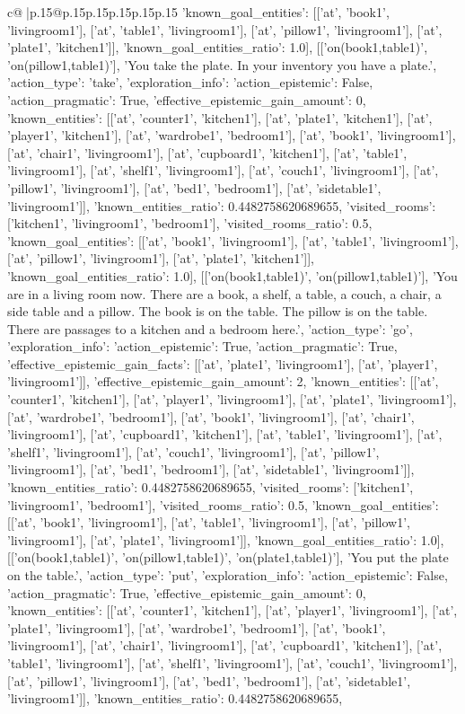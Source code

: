 \documentclass{article}
\begin{document}
{\begin{supertabular}{c@{$\;$}|p{.15\linewidth}@{}p{.15\linewidth}p{.15\linewidth}p{.15\linewidth}p{.15\linewidth}p{.15\linewidth}}
{{{'known_goal_entities': [['at', 'book1', 'livingroom1'], ['at', 'table1', 'livingroom1'], ['at', 'pillow1', 'livingroom1'], ['at', 'plate1', 'kitchen1']], 'known_goal_entities_ratio': 1.0}}], [['on(book1,table1)', 'on(pillow1,table1)'], 'You take the plate. In your inventory you have a plate.\n', {'action_type': 'take', 'exploration_info': {'action_epistemic': False, 'action_pragmatic': True, 'effective_epistemic_gain_amount': 0, 'known_entities': [['at', 'counter1', 'kitchen1'], ['at', 'plate1', 'kitchen1'], ['at', 'player1', 'kitchen1'], ['at', 'wardrobe1', 'bedroom1'], ['at', 'book1', 'livingroom1'], ['at', 'chair1', 'livingroom1'], ['at', 'cupboard1', 'kitchen1'], ['at', 'table1', 'livingroom1'], ['at', 'shelf1', 'livingroom1'], ['at', 'couch1', 'livingroom1'], ['at', 'pillow1', 'livingroom1'], ['at', 'bed1', 'bedroom1'], ['at', 'sidetable1', 'livingroom1']], 'known_entities_ratio': 0.4482758620689655, 'visited_rooms': ['kitchen1', 'livingroom1', 'bedroom1'], 'visited_rooms_ratio': 0.5, 'known_goal_entities': [['at', 'book1', 'livingroom1'], ['at', 'table1', 'livingroom1'], ['at', 'pillow1', 'livingroom1'], ['at', 'plate1', 'kitchen1']], 'known_goal_entities_ratio': 1.0}}], [['on(book1,table1)', 'on(pillow1,table1)'], 'You are in a living room now. There are a book, a shelf, a table, a couch, a chair, a side table and a pillow. The book is on the table. The pillow is on the table. There are passages to a kitchen and a bedroom here.\n', {'action_type': 'go', 'exploration_info': {'action_epistemic': True, 'action_pragmatic': True, 'effective_epistemic_gain_facts': [['at', 'plate1', 'livingroom1'], ['at', 'player1', 'livingroom1']], 'effective_epistemic_gain_amount': 2, 'known_entities': [['at', 'counter1', 'kitchen1'], ['at', 'player1', 'livingroom1'], ['at', 'plate1', 'livingroom1'], ['at', 'wardrobe1', 'bedroom1'], ['at', 'book1', 'livingroom1'], ['at', 'chair1', 'livingroom1'], ['at', 'cupboard1', 'kitchen1'], ['at', 'table1', 'livingroom1'], ['at', 'shelf1', 'livingroom1'], ['at', 'couch1', 'livingroom1'], ['at', 'pillow1', 'livingroom1'], ['at', 'bed1', 'bedroom1'], ['at', 'sidetable1', 'livingroom1']], 'known_entities_ratio': 0.4482758620689655, 'visited_rooms': ['kitchen1', 'livingroom1', 'bedroom1'], 'visited_rooms_ratio': 0.5, 'known_goal_entities': [['at', 'book1', 'livingroom1'], ['at', 'table1', 'livingroom1'], ['at', 'pillow1', 'livingroom1'], ['at', 'plate1', 'livingroom1']], 'known_goal_entities_ratio': 1.0}}], [['on(book1,table1)', 'on(pillow1,table1)', 'on(plate1,table1)'], 'You put the plate on the table.\n', {'action_type': 'put', 'exploration_info': {'action_epistemic': False, 'action_pragmatic': True, 'effective_epistemic_gain_amount': 0, 'known_entities': [['at', 'counter1', 'kitchen1'], ['at', 'player1', 'livingroom1'], ['at', 'plate1', 'livingroom1'], ['at', 'wardrobe1', 'bedroom1'], ['at', 'book1', 'livingroom1'], ['at', 'chair1', 'livingroom1'], ['at', 'cupboard1', 'kitchen1'], ['at', 'table1', 'livingroom1'], ['at', 'shelf1', 'livingroom1'], ['at', 'couch1', 'livingroom1'], ['at', 'pillow1', 'livingroom1'], ['at', 'bed1', 'bedroom1'], ['at', 'sidetable1', 'livingroom1']], 'known_entities_ratio': 0.4482758620689655, }}}
\end{supertabular}}
\end{document}
